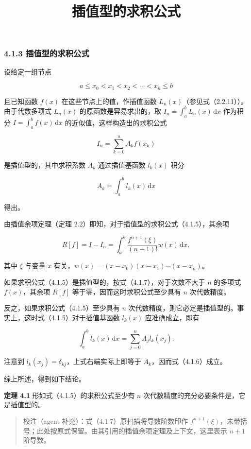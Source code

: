 \documentclass[
  10pt,
  fontset=fandol]{ctexart}
\title{插值型的求积公式}
\author{}
\date{}
\begin{document}
\maketitle

\subsubsection{4.1.3 插值型的求积公式}\label{ux63d2ux503cux578bux7684ux6c42ux79efux516cux5f0f}

设给定一组节点

\[
a\leq x_0<x_1<x_2<\cdots<x_n\leq b
\]

且已知函数 \(f(x)\) 在这些节点上的值，作插值函数 \(L_n(x)\)（参见式（2.2.11））。由于代数多项式 \(L_n(x)\) 的原函数是容易求出的，取 \(I_n=\int_a^b L_n(x)\,\mathrm{d}x\) 作为积分 \(I=\int_a^b f(x)\,\mathrm{d}x\) 的近似值，这样构造出的求积公式

\[
I_n=\sum_{k=0}^n A_kf(x_k)
\tag{4.1.5}
\]

是插值型的，其中求积系数 \(A_k\) 通过插值基函数 \(l_k(x)\) 积分

\[
A_k=\int_a^b l_k(x)\,\mathrm{d}x
\tag{4.1.6}
\]

得出。

由插值余项定理（定理 2.2）即知，对于插值型的求积公式（4.1.5），其余项

\[
R[f]=I-I_n=\int_a^b\frac{f^{n+1}(\xi)}{(n+1)!}w(x)\,\mathrm{d}x,
\tag{4.1.7}
\]

其中 \(\xi\) 与变量 \(x\) 有关，\(w(x)=(x-x_0)(x-x_1)\cdots(x-x_n)\)。

如果求积公式（4.1.5）是插值型的，按式（4.1.7），对于次数不大于 \(n\) 的多项式 \(f(x)\)，其余项 \(R[f]\) 等于零，因而这时求积公式至少具有 \(n\) 次代数精度。

反之，如果求积公式（4.1.5）至少具有 \(n\) 次代数精度，则它必定是插值型的。事实上，这时式（4.1.5）对于插值基函数 \(l_k(x)\) 应准确成立，即有

\[
\int_a^b l_k(x)\,\mathrm{d}x=\sum_{j=0}^n A_jl_k(x_j).
\]

注意到 \(l_k(x_j)=\delta_{kj}\)，上式右端实际上即等于 \(A_k\)，因而式（4.1.6）成立。

综上所述，得到如下结论。

\textbf{定理 4.1} 形如式（4.1.5）的求积公式至少有 \(n\) 次代数精度的充分必要条件是，它是插值型的。

\begin{quote}
校注（agent 补充）：式（4.1.7）原扫描将导数阶数印作 \(f^{n+1}(\xi)\)，未带括号；此处按原式保留。由其引用的插值余项定理及上下文，这里表示 \(n+1\) 阶导数。
\end{quote}
\end{document}

